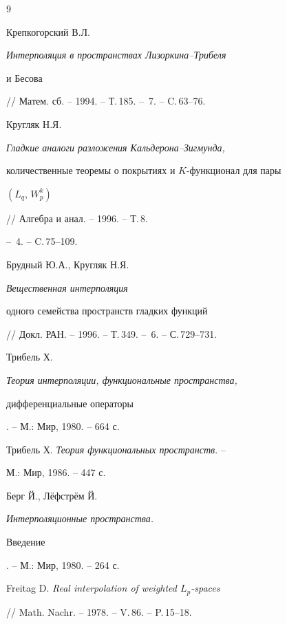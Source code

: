 \begin{thebibliography}{9}







Крепкогорский В.Л. {\it Интерполяция в пространствах Лизоркина--Трибеля


и Бесова} // Матем. сб. -- 1994. -- Т.\,185. -- \No\,7. -- C.\,63--76.




Кругляк Н.Я. {\it Гладкие аналоги разложения Кальдерона--Зигмунда,


количественные теоремы о покрытиях и $K$-функционал для пары


$(L_q,\, W^k_p)$} // Алгебра и анал. -- 1996. -- Т.\,8.


-- \No\,4. -- C.\,75--109.




Брудный Ю.А., Кругляк Н.Я. {\it Вещественная интерполяция


одного семейства пространств гладких функций}


// Докл. РАН. -- 1996. -- Т.\,349. -- \No\,6. -- С.\,729--731.




Трибель Х. {\it Теория интерполяции, функциональные пространства,


дифференциальные операторы}. -- М.: Мир, 1980. -- 664 с.




Трибель Х. {\it Теория функциональных пространств}. --


М.: Мир, 1986. -- 447 с.




Берг Й., Л\"ефстр\"ем Й. {\it Интерполяционные пространства.


Введение}. -- М.: Мир, 1980. -- 264 с.




Freitag D. {\it Real interpolation of weighted $L_p$-spaces}


// Math. Nachr. -- 1978. -- V.\,86. -- P.\,15--18.





\end{thebibliography}





\vskip 2cm





